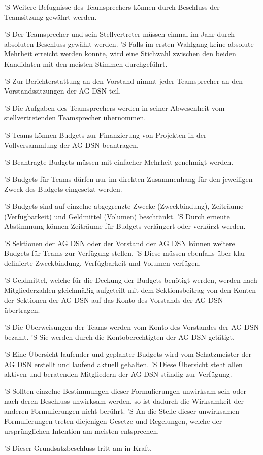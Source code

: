 \documentclass[draft,parskip=half-,DIV=12,mpinclude]{scrartcl}
\begin{document}
\begin{contract}
'S Weitere Befugnisse des Teamsprechers können durch Beschluss der Teamsitzung gewährt werden.

'S Der Teamsprecher und sein Stellvertreter müssen einmal im Jahr durch absoluten Beschluss gewählt werden.
'S Falls im ersten Wahlgang keine absolute Mehrheit erreicht werden konnte, wird eine Stichwahl zwischen den beiden Kandidaten mit den meisten Stimmen durchgeführt.

'S Zur Berichterstattung an den Vorstand nimmt jeder Teamsprecher an den Vorstandssitzungen der AG DSN teil.

'S Die Aufgaben des Teamsprechers werden in seiner Abwesenheit vom stellvertretenden Teamsprecher übernommen.


'S Teams können Budgets zur Finanzierung von Projekten in der Vollversammlung der AG DSN beantragen.

'S Beantragte Budgets müssen mit einfacher Mehrheit genehmigt werden.

'S Budgets für Teams dürfen nur im direkten Zusammenhang für den jeweiligen Zweck des Budgets eingesetzt werden.

'S Budgets sind auf einzelne abgegrenzte Zwecke (Zweckbindung), Zeiträume (Verfügbarkeit) und Geldmittel (Volumen) beschränkt.
'S Durch erneute Abstimmung können Zeiträume für Budgets verlängert oder verkürzt werden.

'S Sektionen der AG DSN oder der Vorstand der AG DSN können weitere Budgets für Teams zur Verfügung stellen.
'S Diese müssen ebenfalls über klar definierte Zweckbindung, Verfügbarkeit und Volumen verfügen.

'S Geldmittel, welche für die Deckung der Budgets benötigt werden, werden nach Mitgliederzahlen gleichmäßig aufgeteilt mit dem Sektionsbeitrag von den Konten der Sektionen der AG DSN auf das Konto des Vorstands der AG DSN übertragen.

'S Die Überweisungen der Teams werden vom Konto des Vorstandes der AG DSN bezahlt.
'S Sie werden durch die Kontoberechtigten der AG DSN getätigt.

'S Eine Übersicht laufender und geplanter Budgets wird vom Schatzmeister der AG DSN erstellt und laufend aktuell gehalten.
'S Diese Übersicht steht allen aktiven und beratenden Mitgliedern der AG DSN ständig zur Verfügung.

'S Sollten einzelne Bestimmungen dieser Formulierungen unwirksam sein oder nach deren Beschluss unwirksam werden, so ist dadurch die Wirksamkeit der anderen Formulierungen nicht berührt.
'S An die Stelle dieser unwirksamen Formulierungen treten diejenigen Gesetze und Regelungen, welche der ursprünglichen Intention am meisten entsprechen.

'S Dieser Grundsatzbeschluss tritt am  in Kraft.

\end{contract}
\end{document}
